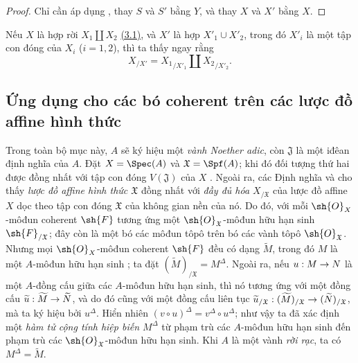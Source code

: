 \documentclass[oneside]{amsart}
\makeatletter
\newcommand{\ega@arrow}[2]{\mathchoice{#1}{#2}{#2}{#2}}
\renewcommand{\to}{\ega@arrow{\longrightarrow}{\rightarrow}}
\newcommand{\oldpage}[2][]{{\marginnote{\normalfont\textbf{#1}~|~#2}}\ignorespaces}
\let\EGAOriginalLabel\label
\renewcommand{\label}[1]{\phantomsection\EGAOriginalLabel{#1}}
\makeatother
\begin{document}
\begin{proof}
Chỉ cần áp dụng , thay $S$ và $S'$ bằng $Y$, và thay $X$ và $X'$ bằng $X$.
\end{proof}

\begin{remark}[10.9.10]
\label{I.10.9.10}
\oldpage[I]{201}
Nếu $X$ là hợp rời $X_1\amalg X_2$ \hyperref[subsection:I.3.1]{(3.1)}, và $X'$ là hợp $X'_1\cup X'_2$, trong đó $X'_i$ là một tập con đóng của $X_i$ ($i=1,2$), thì ta thấy ngay rằng
\[
  X_{/X'}={X_1}_{/X'_1}\amalg {X_2}_{/X'_2}.
\]
\end{remark}

\subsection{Ứng dụng cho các bó coherent trên các lược đồ affine hình thức}
\label{subsection:I.10.10}

\begin{env}[10.10.1]
\label{I.10.10.1}
Trong toàn bộ mục này, $A$ sẽ ký hiệu một \emph{vành Noether adic}, còn $\mathfrak{J}$ là một iđêan định nghĩa của $A$.
Đặt $X=\Spec(A)$ và $\mathfrak{X}=\Spf(A)$; khi đó đối tượng thứ hai được đồng nhất với tập con đóng $V(\mathfrak{J})$ của $X$ .
Ngoài ra, các Định nghĩa  và  cho thấy \emph{lược đồ affine hình thức $\mathfrak{X}$} đồng nhất với \emph{đầy đủ hóa $X_{/\mathfrak{X}}$} của lược đồ affine $X$ dọc theo tập con đóng $\mathfrak{X}$ của không gian nền của nó.
Do đó, với mỗi $\sh{O}_X$-môđun coherent $\sh{F}$ tương ứng một $\sh{O}_\mathfrak{X}$-môđun hữu hạn sinh $\sh{F}_{/\mathfrak{X}}$; đây còn là một bó các môđun tôpô trên bó các vành tôpô $\sh{O}_\mathfrak{X}$.
Nhưng mọi $\sh{O}_X$-môđun coherent $\sh{F}$ đều có dạng $\widetilde{M}$, trong đó $M$ là một $A$-môđun hữu hạn sinh ; ta đặt $(\widetilde{M})_{/\mathfrak{X}}=M^\Delta$.
Ngoài ra, nếu $u:M\to N$ là một $A$-đồng cấu giữa các $A$-môđun hữu hạn sinh, thì nó tương ứng với một đồng cấu $\widetilde{u}:\widetilde{M}\to\widetilde{N}$, và do đó cũng với một đồng cấu liên tục $\widetilde{u}_{/\mathfrak{X}}:(\widetilde{M})_{/\mathfrak{X}}\to(\widetilde{N})_{/\mathfrak{X}}$, mà ta ký hiệu bởi $u^\Delta$.
Hiển nhiên $(v\circ u)^\Delta=v^\Delta\circ u^\Delta$; như vậy ta đã xác định một \emph{hàm tử cộng tính hiệp biến $M^\Delta$} từ phạm trù các $A$-môđun hữu hạn sinh đến phạm trù các $\sh{O}_\mathfrak{X}$-môđun hữu hạn sinh.
Khi $A$ là một vành \emph{rời rạc}, ta có $M^\Delta=\widetilde{M}$.
\end{env}
\end{document}
